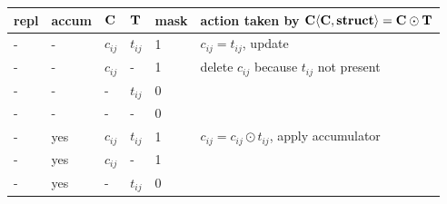 \begin{table}
{\small
\begin{tabular}{lllll|l}
\hline
repl & accum & ${\bf C}$ & ${\bf T}$ & mask & action taken by ${\bf C \langle C,struct \rangle = C \odot T}$ \\
\hline
    -  &-   & $c_{ij}$ & $t_{ij}$  & 1    &  $c_{ij} = t_{ij}$, update \\
    -  &-   & $c_{ij}$ &  -        & 1    &  delete $c_{ij}$ because $t_{ij}$ not present \\
    -  &-   &  -       & $t_{ij}$  & 0    &   \\
    -  &-   &  -       &  -        & 0    &   \\
\hline
\hline
    -  &yes & $c_{ij}$ & $t_{ij}$  & 1    &  $c_{ij} = c_{ij} \odot t_{ij}$, apply accumulator \\
    -  &yes & $c_{ij}$ &  -        & 1    &   \\
    -  &yes &  -       & $t_{ij}$  & 0    &   \\

\end{tabular}}
\end{table}
